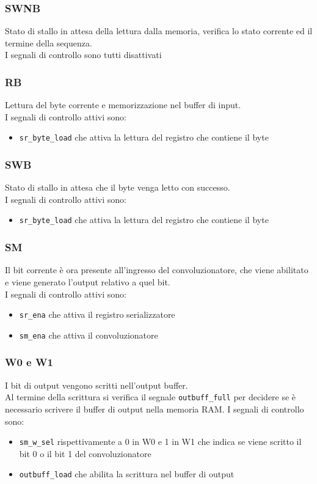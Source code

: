 \documentclass[12pt, a4paper]{article}
\begin{document}
\subsubsection{SWNB}
Stato di stallo in attesa della lettura dalla memoria, verifica lo stato corrente ed il termine della sequenza.\\
I segnali di controllo sono tutti disattivati

\subsubsection{RB}
Lettura del byte corrente e memorizzazione nel buffer di input.\\
I segnali di controllo attivi sono:
\begin{itemize}
    \item \texttt{sr\_byte\_load} che attiva la lettura del registro che contiene il byte
\end{itemize}

\subsubsection{SWB}
Stato di stallo in attesa che il byte venga letto con successo.\\
I segnali di controllo attivi sono:
\begin{itemize}
    \item \texttt{sr\_byte\_load} che attiva la lettura del registro che contiene il byte
\end{itemize}

\subsubsection{SM}
Il bit corrente è ora presente all'ingresso del convoluzionatore, che viene abilitato e viene
generato l'output relativo a quel bit.\\
I segnali di controllo attivi sono:
\begin{itemize}
    \item \texttt{sr\_ena} che attiva il registro serializzatore
    \item \texttt{sm\_ena} che attiva il convoluzionatore
\end{itemize}

\subsubsection{W0 e W1}
I bit di output vengono scritti nell'output buffer.\\
Al termine della scrittura si verifica il segnale \texttt{outbuff\_full} per decidere
se è necessario scrivere il buffer di output nella memoria RAM.
I segnali di controllo sono:
\begin{itemize}
    \item \texttt{sm\_w\_sel} rispettivamente a 0 in W0 e 1 in W1 che indica se viene 
                              scritto il bit 0 o il bit 1 del convoluzionatore
    \item \texttt{outbuff\_load} che abilita la scrittura nel buffer di output
\end{itemize}
\end{document}
